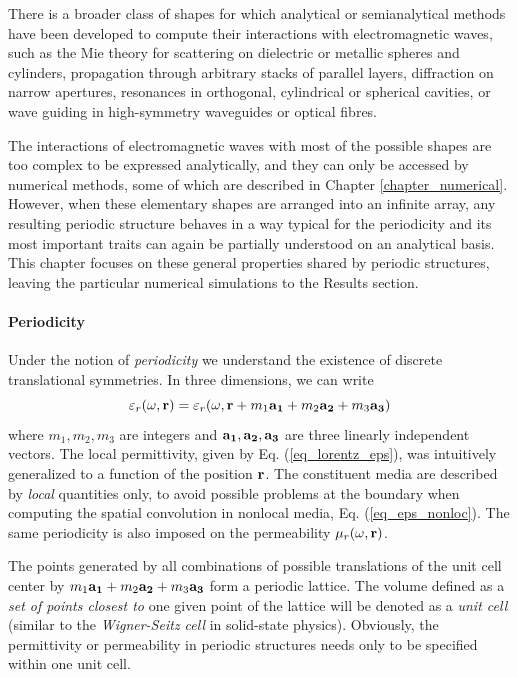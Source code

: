 There is a broader class of shapes for which analytical or semianalytical methods have been developed to compute their interactions with electromagnetic waves, such as the Mie theory for scattering on dielectric or metallic spheres and cylinders, propagation through arbitrary stacks of parallel layers, diffraction on narrow apertures, resonances in orthogonal, cylindrical or spherical cavities, or wave guiding in high-symmetry waveguides or optical fibres. 

The interactions of electromagnetic waves with most of the possible shapes are too complex to be expressed analytically, and they can only be accessed by numerical methods, some of which are described in Chapter \ref{chapter_numerical}. However, when these elementary shapes are arranged into an infinite array, any resulting periodic structure behaves in a way typical for the periodicity and its most important traits can again be partially understood on an analytical basis.
This chapter focuses on these general properties shared by periodic structures, leaving the particular numerical simulations to the Results section.

\paragraph{Periodicity}%
Under the notion of \textit{periodicity} we understand the existence of discrete translational symmetries. In three dimensions, we can write
\begin{equation} \varepsilon_r(\omega, {\mathbf{r}}) = \varepsilon_r(\omega, {\mathbf{r}} + m_1 {\mathbf{a_1}} + m_2 {\mathbf{a_2}} + m_3 {\mathbf{a_3}}) \label{eq_trsym}\end{equation}
where $m_1, m_2, m_3$ are integers and ${\mathbf{a_1}}, {\mathbf{a_2}}, {\mathbf{a_3}}$ are three linearly independent vectors. The local permittivity, given by Eq. (\ref{eq_lorentz_eps}), was intuitively generalized to a function of the position ${\mathbf{r}}$. The constituent media are described by \textit{local} quantities only, to avoid possible problems at the boundary when computing the spatial convolution  in nonlocal media, Eq. (\ref{eq_eps_nonloc}).  The same periodicity is also imposed on the permeability $\mu_r(\omega,{\mathbf{r}})$. 

The points generated by all combinations of possible translations of the unit cell center by $m_1 {\mathbf{a_1}} + m_2 {\mathbf{a_2}} + m_3 {\mathbf{a_3}}$ form a periodic lattice.
The volume defined as a \textit{set of points closest to} one given point of the lattice will be denoted as a \textit{unit cell} (similar to the \textit{Wigner-Seitz cell} in solid-state physics). Obviously, the permittivity or permeability in periodic structures needs only to be specified within one unit cell.

